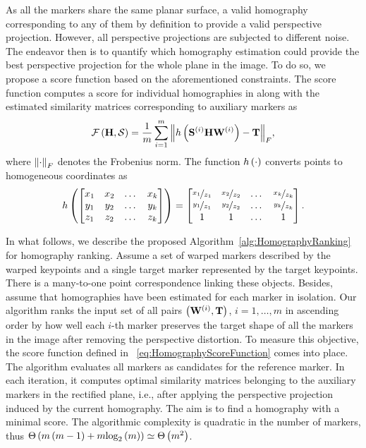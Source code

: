 As all the markers share the same planar surface, a valid homography corresponding to any of them by definition to provide a valid perspective projection. However, all perspective projections are subjected to different noise. The endeavor then is to quantify which homography estimation could provide the best perspective projection for the whole plane in the image. To do so, we propose a score function based on the aforementioned constraints. The score function computes a score for individual homographies in along with the estimated similarity matrices corresponding to auxiliary markers as
\begin{equation}
    \label{eq:HomographyScoreFunction}
    {\mathcal{F}} \left( \mathbf{H}, \mathcal{S} \right) =
    \frac{1}{m}
    \sum_{i = 1}^{m}
    {\left\Vert {
        {h} \left( 
            {\mathbf{S}}^{\left( {i} \right)}
            \mathbf{H}{\mathbf{W}}^{\left( {i} \right)}
         \right)
        -
        \mathbf{T}
    } \right\Vert}_F,
\end{equation}
where ${\left\Vert {\cdot} \right\Vert}_F$ denotes the Frobenius norm. The function ${h} \left( \cdot \right)$ converts points to homogeneous coordinates as
\begin{equation}
    \label{eq:HomoCoordsConversion}
    {h} \left( 
        \begin{bmatrix}
            x_1 & x_2 & \dots & x_k \\
            y_1 & y_2 & \dots & y_k \\
            z_1 & z_2 & \dots & z_k
        \end{bmatrix}
     \right) =
    \begin{bmatrix}
        \nicefrac{x_1}{z_1} & \nicefrac{x_2}{z_2} & \dots & \nicefrac{x_k}{z_k} \\
        \nicefrac{y_1}{z_1} & \nicefrac{y_2}{z_2} & \dots & \nicefrac{y_k}{z_k} \\
        1                   & 1                   & \dots & 1
    \end{bmatrix}.
\end{equation}

In what follows, we describe the proposed Algorithm~\ref{alg:HomographyRanking} for homography ranking. Assume a set of warped markers described by the warped keypoints and a single target marker represented by the target keypoints. There is a many-to-one point correspondence linking these objects. Besides, assume that homographies have been estimated for each marker in isolation. Our algorithm ranks the input set of all pairs $\left( {{\mathbf{W}}^{\left( {i} \right)}, \mathbf{T}} \right)$, $i = 1, \dots, m$ in ascending order by how well each $i$-th marker preserves the target shape of all the markers in the image after removing the perspective distortion. To measure this objective, the score function defined in \eqstr{}~\ref{eq:HomographyScoreFunction} comes into place. The algorithm evaluates all markers as candidates for the reference marker. In each iteration, it computes optimal similarity matrices belonging to the auxiliary markers in the rectified plane, i.e., after applying the perspective projection induced by the current homography. The aim is to find a homography with a minimal score. The algorithmic complexity is quadratic in the number of markers, thus ${\Theta} \left( m \left( {m - 1} \right) + m {\text{log}_2} \left( m \right) \right) \simeq {\Theta} \left( m^2 \right)$.

